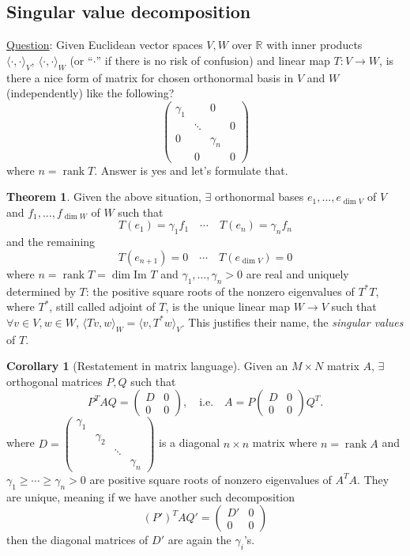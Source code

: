 \documentclass[a4paper]{article}
\newcommand{\rank}{\operatorname{rank}}
\theoremstyle{definition}
\newtheorem{thm}[defn]{Theorem}
\newtheorem{coro}[defn]{Corollary}
\begin{document}
\subsection{Singular value decomposition}
\underline{Question}: Given Euclidean vector spaces $V,W$ over $\mathbb R$ with inner products $\langle \cdot ,\cdot \rangle_V,\ \langle \cdot,\cdot \rangle_W$ (or ``$\cdot$'' if there is no risk of confusion) and linear map $T:V\rightarrow W$, is there a nice form of matrix for chosen orthonormal basis in $V$ and $W$ (independently) like the following?
\[
\begin{pmatrix}
\gamma_1 & & 0 \\
 & \ddots & &  0\\
0 & & \gamma_n \\
 & 0 & & 0
\end{pmatrix}
\]
where $n=\rank T$. Answer is yes and let's formulate that.
\begin{thm}
Given the above situation, $\exists$ orthonormal bases $e_1,\ldots,e_{\dim V}$ of $V$ and $f_1,\ldots,f_{\dim W}$ of $W$ such that
\[
T(e_1)=\gamma_1 f_1 \quad \cdots \quad T(e_n) = \gamma _n f_n
\]
and the remaining
\[
T(e_{n+1})=0 \quad \cdots \quad T({e_{\dim V}}) =0
\]
where $n=\rank T=\dim \text{Im } T$ and $\gamma_1,\ldots,\gamma_n >0$ are real and uniquely determined by $T$: the positive square roots of the nonzero eigenvalues of $T^\ast T$, where $T^\ast$, still called adjoint of $T$, is the unique linear map $W\rightarrow V$ such that $\forall v\in V,w\in W$, $\langle Tv,w\rangle _W = \langle v,T^\ast w\rangle_V$. This justifies their name, the \textit{singular values} of $T$.
\end{thm}
\begin{coro}[Restatement in matrix language]
Given an $M\times N$ matrix $A$, $\exists$ orthogonal matrices $P,Q$ such that
\[
P^T AQ= \begin{pmatrix}
D & 0 \\ 0 & 0
\end{pmatrix},\quad \text{i.e.}\quad A=P\begin{pmatrix}
D & 0 \\ 0 & 0
\end{pmatrix} Q^T.
\]
where $D=\begin{pmatrix}
\gamma_1 & \\ & \gamma _2 \\ & & \ddots \\ &&& \gamma_n
\end{pmatrix}$ is a diagonal $n\times n$ matrix where $n=\rank A$ and $\gamma_1 \geq \cdots \geq \gamma_n >0$ are positive square roots of nonzero eigenvalues of $A^T A$. They are unique, meaning if we have another such decomposition
\[
\left(P'\right)^T AQ'= \begin{pmatrix}
D' & 0 \\ 0 & 0
\end{pmatrix}
\]
then the diagonal matrices of $D'$ are again the $\gamma_i$'s.
\end{coro}
\end{document}
